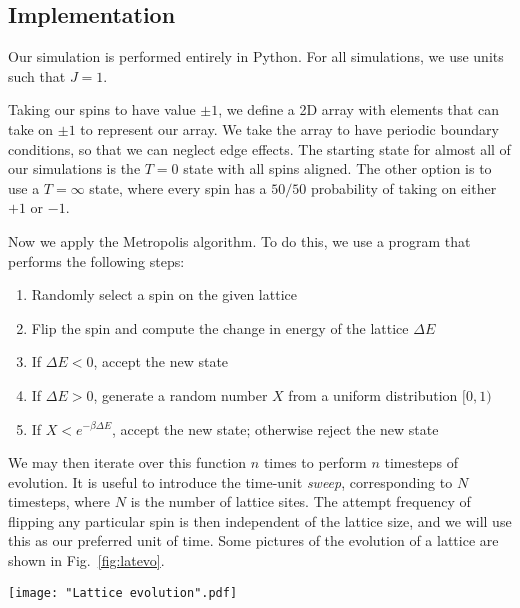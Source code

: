 \documentclass[twocolumn,aps,prl]{revtex4-1} %
\begin{document}
\subsection{Implementation}
Our simulation is performed entirely in Python. For all simulations, we use units such that $J = 1$.

Taking our spins to have value $\pm 1$, we define a 2D array with elements that can take on $\pm 1$ to represent our array. We take the array to have periodic boundary conditions, so that we can neglect edge effects. The starting state for almost all of our simulations is the $T = 0$ state with all spins aligned. The other option is to use a $T = \infty$ state, where every spin has a $50/50$ probability of taking on either $+1$ or $-1$. 

Now we apply the Metropolis algorithm. To do this, we use a program that performs the following steps:
\begin{enumerate}
	\item Randomly select a spin on the given lattice
	\item Flip the spin and compute the change in energy of the lattice $\Delta E$
	\item If $\Delta E < 0$, accept the new state
	\item If $\Delta E > 0$, generate a random number $X$ from a uniform distribution $[0,1)$
	\item If $X < e^{-\beta \Delta E}$, accept the new state; otherwise reject the new state
\end{enumerate}
We may then iterate over this function $n$ times to perform $n$ timesteps of evolution. It is useful to introduce the time-unit \textit{sweep}, corresponding to $N$ timesteps, where $N$ is the number of lattice sites. The attempt frequency of flipping any particular spin is then independent of the lattice size, and we will use this as our preferred unit of time. Some pictures of the evolution of a lattice are shown in Fig.~\ref{fig:latevo}.
\begin{figure*}
	\texttt{[image: "Lattice evolution".pdf]}
	\caption{\label{fig:latevo}The evolution of a $100 \times 100$ square lattice at $T = 2.4$ via the Metropolis algorithm. The sequence is ordered from left to right, top to bottom. The two spin states $+1$ and $-1$ correspond to black and white, respectively. We have initialized the system in the $T = 0$ state, and plotted the system after 0, 1, 5, 10, 20, 50, 100, 500, and 1000 Monte Carlo sweeps.}
\end{figure*}
\end{document}

